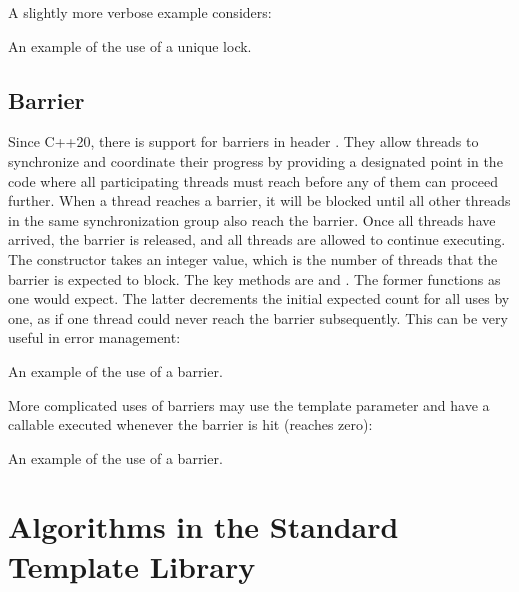 \begin{itemize}
\begin{end}
A slightly more verbose example considers:

\raggedbottom
\begin{codebox}[]{\href{https://godbolt.org/z/qeYzaz6We}{\ExternalLink}}
\footnotesize An example of the use of a unique lock.
\tcblower
{}
\end{codebox}

\subsection{Barrier}

Since C++20, there is support for barriers in header . They allow threads to synchronize and coordinate their progress by providing a designated point in the code where all participating threads must reach before any of them can proceed further. When a thread reaches a barrier, it will be blocked until all other threads in the same synchronization group also reach the barrier. Once all threads have arrived, the barrier is released, and all threads are allowed to continue executing. The constructor takes an integer value, which is the number of threads that the barrier is expected to block. The key methods are  and . The former functions as one would expect. The latter decrements the initial expected count for all uses by one, as if one thread could never reach the barrier subsequently. This can be very useful in error management:

\raggedbottom
\begin{codebox}[]{\href{https://godbolt.org/z/fT17E5P4x}{\ExternalLink}}
\footnotesize An example of the use of a barrier.
\tcblower
{}
\end{codebox}

More complicated uses of barriers may use the template parameter  and have a callable executed whenever the barrier is hit (reaches zero):

\raggedbottom
\begin{codebox}[]{\href{https://godbolt.org/z/McM63hnn4}{\ExternalLink}}
\footnotesize An example of the use of a barrier.
\tcblower
{}
\end{codebox}

\section{Algorithms in the Standard Template Library}


\end{end}
\end{itemize}
